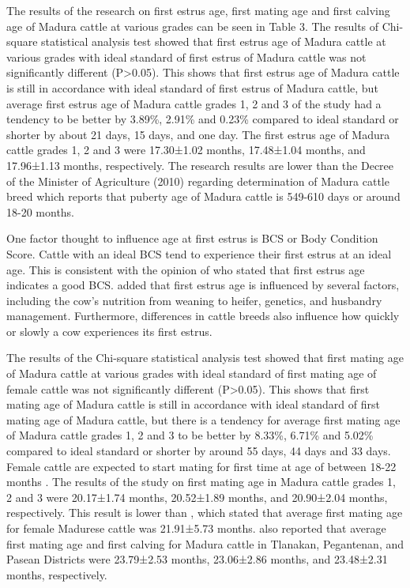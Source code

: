 \documentclass[9pt,article,twoside]{fapet-rho-class/fapet-rho}
\begin{document}
The results of the research on first estrus age, first mating age and first calving age of Madura cattle at various grades can be seen in Table 3. The results of Chi-square statistical analysis test showed that first estrus age of Madura cattle at various grades with ideal standard of first estrus of Madura cattle was not significantly different (P>0.05). This shows that first estrus age of Madura cattle is still in accordance with ideal standard of first estrus of Madura cattle, but average first estrus age of Madura cattle grades 1, 2 and 3 of the study had a tendency to be better by 3.89\%, 2.91\% and 0.23\% compared to ideal standard or shorter by about 21 days, 15 days, and one day. The first estrus age of Madura cattle grades 1, 2 and 3 were 17.30±1.02 months, 17.48±1.04 months, and 17.96±1.13 months, respectively. The research results are lower than the Decree of the Minister of Agriculture (2010) regarding determination of Madura cattle breed which reports that puberty age of Madura cattle is 549-610 days or around 18-20 months.

One factor thought to influence age at first estrus is BCS or Body Condition Score. Cattle with an ideal BCS tend to experience their first estrus at an ideal age. This is consistent with the opinion of \citet{Heryani2019} who stated that first estrus age indicates a good BCS. \citet{Wicaksana2024} added that first estrus age is influenced by several factors, including the cow's nutrition from weaning to heifer, genetics, and husbandry management. Furthermore, differences in cattle breeds also influence how quickly or slowly a cow experiences its first estrus.

The results of the Chi-square statistical analysis test showed that first mating age of Madura cattle at various grades with ideal standard of first mating age of female cattle was not significantly different (P>0.05). This shows that first mating age of Madura cattle is still in accordance with ideal standard of first mating age of Madura cattle, but there is a tendency for average first mating age of Madura cattle grades 1, 2 and 3 to be better by 8.33\%, 6.71\% and 5.02\% compared to ideal standard or shorter by around 55 days, 44 days and 33 days. Female cattle are expected to start mating for first time at age of between 18-22 months \citep{Ismaya2014}. The results of the study on first mating age in Madura cattle grades 1, 2 and 3 were 20.17±1.74 months, 20.52±1.89 months, and 20.90±2.04 months, respectively. This result is lower than \citet{Kutsiyah2017}, which stated that average first mating age for female Madurese cattle was 21.91±5.73 months. \citet{Wisono2015} also reported that average first mating age and first calving for Madura cattle in Tlanakan, Pegantenan, and Pasean Districts were 23.79±2.53 months, 23.06±2.86 months, and 23.48±2.31 months, respectively.
\end{document}
